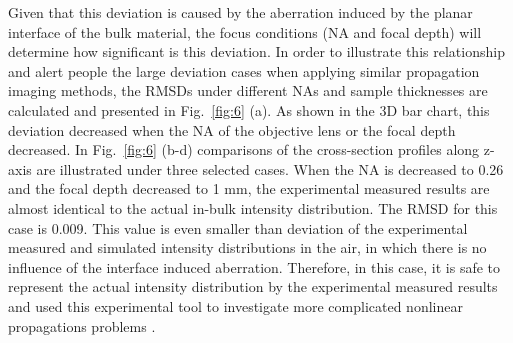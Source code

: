 \documentclass[9pt,twocolumn,twoside]{osajnl}
\begin{document}
Given that this deviation is caused by the aberration induced by the planar interface of the bulk material, the focus conditions (NA and focal depth) will determine how significant is this deviation. In order to illustrate this relationship and alert people the large deviation cases when applying similar propagation imaging methods, the RMSDs under different NAs and sample thicknesses are calculated and presented in Fig.~\ref{fig:6} (a). As shown in the 3D bar chart, this deviation decreased when the NA of the objective lens or the focal depth decreased. In Fig.~\ref{fig:6} (b-d) comparisons of the cross-section profiles along z-axis are illustrated under three selected cases. When the NA is decreased to 0.26 and the focal depth decreased to 1 mm, the experimental measured results are almost identical to the actual in-bulk intensity distribution. The RMSD for this case is 0.009. This value is even smaller than deviation of the experimental measured and simulated intensity distributions in the air, in which there is no influence of the interface induced aberration. Therefore, in this case, it is safe to represent the actual intensity distribution by the experimental measured results and used this experimental tool to investigate more complicated nonlinear propagations problems \cite{Chambonneau2020}.

\end{document}
